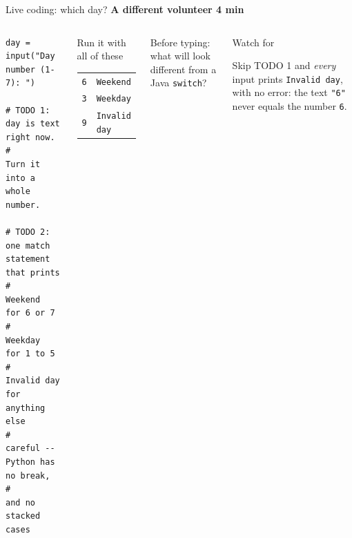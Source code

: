 \documentclass[aspectratio=169]{beamer}
\newcommand{\code}[1]{\texttt{#1}}
\newcommand{\timing}[2]{\hfill{\small\textcolor{bkblue}{\textbf{#1 \textbullet{} #2}}}}
\begin{document}
\begin{frame}[fragile]{Live coding: which day? \timing{A different volunteer}{4 min}}
  \begin{columns}[T,onlytextwidth]
\begin{lstlisting}[language=Py]
day = input("Day number (1-7): ")

# TODO 1: day is text right now.
#         Turn it into a whole number.

# TODO 2: one match statement that prints
#           Weekend       for 6 or 7
#           Weekday       for 1 to 5
#           Invalid day   for anything else
#         careful -- Python has no break,
#         and no stacked cases
\end{lstlisting}
    \begin{discussionbox}{Run it with all of these}
      \small
      \renewcommand{\arraystretch}{1.05}
      \begin{tabular}{@{}r@{\quad$\to$\quad}l@{}}
        \code{6} & \code{Weekend}\\
        \code{3} & \code{Weekday}\\
        \code{9} & \code{Invalid day}\\
      \end{tabular}
    \end{discussionbox}
    \vspace{0.3em}
    {\small Before typing: what will look different from a Java \code{switch}?}
    \vspace{0.2em}
    \pause
    \begin{contextbox}{Watch for}
      \small\raggedright
      Skip TODO 1 and \emph{every} input prints \code{Invalid day}, with no error:
      the text \code{"6"} never equals the number \code{6}.
    \end{contextbox}
  \end{columns}
\end{frame}
\end{document}
